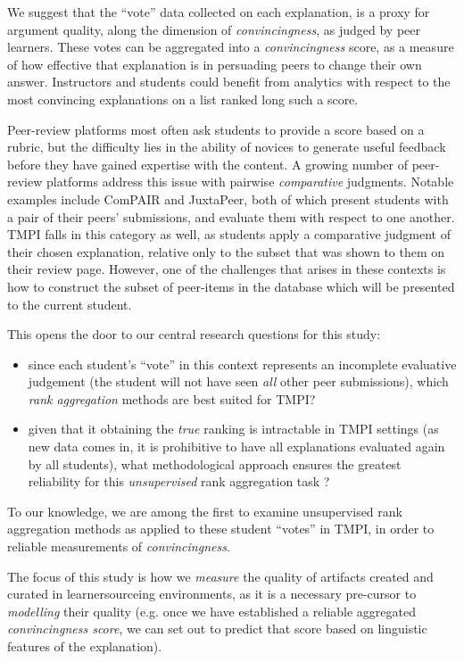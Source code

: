 \documentclass[acmsmall]{acmart}
\begin{document}
We suggest that the ``vote'' data collected on each explanation, is a proxy for 
argument quality, along the dimension of \textit{convincingness}, as judged by 
peer learners. 
These votes can be aggregated into a \textit{convincingness} score, as a 
measure of how effective that explanation is in persuading peers to change 
their own answer.
Instructors and students could benefit from analytics with respect to the most 
convincing explanations on a list ranked long such a score.

Peer-review platforms most often ask students to provide a score based on a 
rubric, but the difficulty lies in the ability of novices to generate useful 
feedback before they have gained expertise with the content. 
A growing number of peer-review platforms address this issue with pairwise
\textit{comparative} judgments.
Notable examples include ComPAIR\cite{potter_compair:_2017} and 
JuxtaPeer\cite{cambre_juxtapeer:_2018}, both of which present students with a 
pair of their peers' submissions, and evaluate them with respect to one another.
TMPI falls in this category as well, as students apply a comparative judgment 
of their chosen explanation, relative only to the subset that was shown to them 
on their review page. 
However, one of the challenges that arises in these contexts is how to 
construct the subset of peer-items in the database which will be presented to 
the current student.

This opens the door to our central research questions for this study: 
\begin{itemize}
	\item since each student's ``vote'' in this context represents an 
	incomplete evaluative judgement (the student will not have seen 
	\textit{all} other peer submissions), which \textit{rank aggregation} 
	methods are best suited for TMPI?
	\item given that it obtaining the \textit{true} ranking is intractable in 
	TMPI settings (as new data comes in, it is prohibitive to have all 
	explanations evaluated again by all students), what methodological approach 
	ensures the greatest reliability for this \textit{unsupervised} rank 
	aggregation task ?
\end{itemize}

	
To our knowledge, we are among the first to examine unsupervised rank 
aggregation methods as applied to these student ``votes'' in TMPI, in order to 
reliable measurements of \textit{convincingness}. 

The focus of this study is how we \textit{measure} the quality of artifacts 
created and curated in learnersourceing environments, as it is a necessary 
pre-cursor to \textit{modelling} their quality (e.g. once we have established a 
reliable aggregated \textit{convincingness score}, we can set out to predict 
that score based on linguistic features of the explanation).
\end{document}
